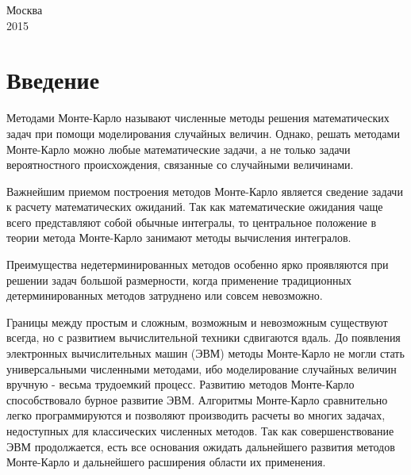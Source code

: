 \documentclass[a4paper,12pt]{article}
\begin{document}
\begin{titlepage}

\vspace{120px}
{\large Москва\\2015}\\[2cm] %

\vfill %

\end{titlepage}



\tableofcontents

\newpage
\section{Введение}


Методами Монте-Карло называют численные методы решения математических задач при помощи моделирования случайных величин. Однако, решать методами Монте-Карло можно любые математические задачи, а не только задачи вероятностного происхождения, связанные со случайными величинами.

Важнейшим приемом построения методов Монте-Карло является сведение задачи к расчету математических ожиданий. Так как математические ожидания чаще всего представляют собой обычные интегралы, то центральное положение в теории метода Монте-Карло занимают методы вычисления интегралов.

Преимущества недетерминированных методов особенно ярко проявляются при решении задач большой размерности, когда применение традиционных детерминированных методов затруднено или совсем невозможно.

Границы между простым и сложным, возможным и невозможным существуют всегда, но с развитием вычислительной техники сдвигаются вдаль. До появления электронных вычислительных машин (ЭВМ) методы Монте-Карло не могли стать универсальными численными методами, ибо моделирование случайных величин вручную - весьма трудоемкий процесс. Развитию методов Монте-Карло способствовало бурное развитие ЭВМ. Алгоритмы Монте-Карло сравнительно легко программируются и позволяют производить расчеты во многих задачах, недоступных для классических численных методов. Так как совершенствование ЭВМ продолжается, есть все основания ожидать дальнейшего развития методов Монте-Карло и дальнейшего расширения области их применения.
\end{document}
